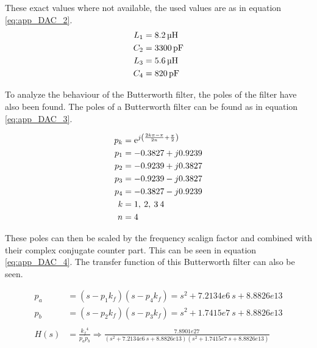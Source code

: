 These exact values where not available, the used values are as in equation \ref{eq:app_DAC_2}.
\begin{equation}
    \label{eq:app_DAC_2}
    \begin{split}
        L_1 &= \SIQ{8.2}{\micro\henry}\\
        C_2 &= \SIQ{3300}{\pico\farad} \\
        L_3 &= \SIQ{5.6}{\micro\henry}\\
        C_4 &= \SIQ{820}{\pico\farad} \\
    \end{split}
    \end{equation}

To analyze the behaviour of the Butterworth filter, the poles of the filter have also been found. The poles of a Butterworth filter can be found as in equation \ref{eq:app_DAC_3}.

\begin{equation}
\label{eq:app_DAC_3}
\begin{split}
    p_k &= \mathrm{e}^{j\left(\frac{2k\pi-\pi}{2n}+\frac{\pi}{2}\right)} \\
    p_1 &= -0.3827+j0.9239 \\
    p_2 &= -0.9239+j0.3827 \\
    p_3 &= -0.9239-j0.3827 \\
    p_4 &= -0.3827-j0.9239 \\
    k &= 1, \:2,\:3\:4 \\
    n &= 4
\end{split}
\end{equation}

These poles can then be scaled by the frequency scalign factor and combined with their complex conjugate counter part. This can be seen in equation \ref{eq:app_DAC_4}. The transfer function of this Butterworth filter can also be seen.

\begin{equation}
\label{eq:app_DAC_4}
\begin{split}
    p_a &= (s-p_1 k_f)(s-p_4 k_f) = s^2 +7.2134e6 \:s+8.8826e13 \\
    p_b &= (s-p_2 k_f)(s-p_3 k_f) = s^2 +1.7415e7 \:s+8.8826e13 \\
    \\
    H(s) &= \frac{{k_f}^4}{p_a p_b} \Rightarrow \frac{7.8901e27}{(s^2 +7.2134e6 \:s+8.8826e13)(s^2 +1.7415e7 \:s+8.8826e13)}
\end{split}
\end{equation}

